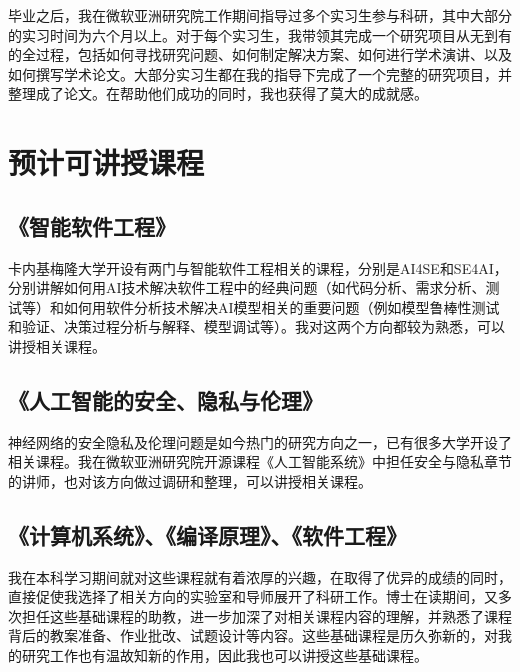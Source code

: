 \documentclass[12pt]{article}
\begin{document}
毕业之后，我在微软亚洲研究院工作期间指导过多个实习生参与科研，其中大部分的实习时间为六个月以上。对于每个实习生，我带领其完成一个研究项目从无到有的全过程，包括如何寻找研究问题、如何制定解决方案、如何进行学术演讲、以及如何撰写学术论文。大部分实习生都在我的指导下完成了一个完整的研究项目，并整理成了论文。在帮助他们成功的同时，我也获得了莫大的成就感。




\section{预计可讲授课程}

\subsection{《智能软件工程》}
卡内基梅隆大学开设有两门与智能软件工程相关的课程，分别是AI4SE\cite{cmu:ai4se}和SE4AI\cite{cmu:se4ai}，分别讲解如何用AI技术解决软件工程中的经典问题（如代码分析、需求分析、测试等）和如何用软件分析技术解决AI模型相关的重要问题（例如模型鲁棒性测试和验证、决策过程分析与解释、模型调试等）。我对这两个方向都较为熟悉，可以讲授相关课程。

\subsection{《人工智能的安全、隐私与伦理》}
神经网络的安全隐私及伦理问题是如今热门的研究方向之一，已有很多大学开设了相关课程\cite{ucb:trustworthy,ucb:fairness}。我在微软亚洲研究院开源课程《人工智能系统》\cite{microsoft:ai-system}中担任安全与隐私章节的讲师，也对该方向做过调研和整理，可以讲授相关课程。

\subsection{《计算机系统》、《编译原理》、《软件工程》}
我在本科学习期间就对这些课程就有着浓厚的兴趣，在取得了优异的成绩的同时，直接促使我选择了相关方向的实验室和导师展开了科研工作。博士在读期间，又多次担任这些基础课程的助教，进一步加深了对相关课程内容的理解，并熟悉了课程背后的教案准备、作业批改、试题设计等内容。这些基础课程是历久弥新的，对我的研究工作也有温故知新的作用，因此我也可以讲授这些基础课程。


{


}
\end{document}
